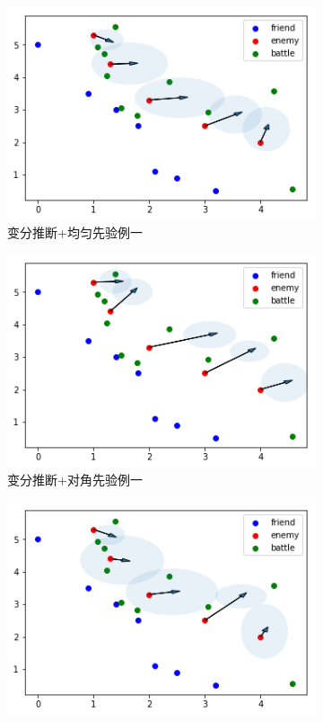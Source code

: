 \documentclass{article}
\begin{document}
\begin{figure}[ht]
  \begin{subfigure}[b]{0.45\linewidth}
    \includegraphics[width=\linewidth]{VI11.png}
    \caption{变分推断+均匀先验例一}
  \end{subfigure}
  \begin{subfigure}[b]{0.45\linewidth}
    \includegraphics[width=\linewidth]{VI12.png}
    \caption{变分推断+对角先验例一}
  \end{subfigure}
  \begin{subfigure}[b]{0.45\linewidth}
    \includegraphics[width=\linewidth]{VI21.png}

\end{subfigure}
\end{figure}
\end{document}
